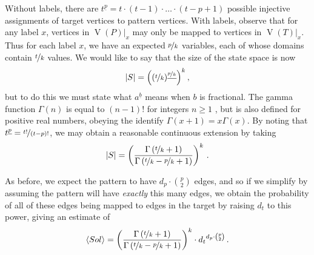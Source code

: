 \documentclass[twoside,11pt]{article}
\newcommand{\citep}[1]{\cite{#1}}
\begin{document}
Without labels, there are $t^{\underline{p}} = t \cdot (t - 1) \cdot \ldots \cdot (t - p + 1)$
possible injective assignments of target vertices to pattern vertices.  With labels, observe that
for any label $x$, vertices in $\operatorname{V}(P)|_x$ may only be mapped to vertices in
$\operatorname{V}(T)|_x$.  Thus for each label $x$, we have an expected $\nicefrac{p}{k}$ variables,
each of whose domains contain $\nicefrac{t}{k}$ values. We would like to say that the size of the
state space is now \[ |S| = \left((\nicefrac{t}{k})^{\underline{\nicefrac{p}{k}}}\right)^{k}
\textnormal{,} \] but to do this we must state what $a^{\underline{b}}$ means when $b$ is
fractional. The gamma function $\Gamma(n)$ is equal to $(n - 1)!$ for integers $n \ge 1$
\citep{Davis59}, but is also defined for positive real numbers, obeying the identify $\Gamma(x + 1)
= x\Gamma(x)$. By noting that $t^{\underline{p}} = \nicefrac{t!}{(t - p)!}$, we may obtain a
reasonable continuous extension by taking \[ |S| = \left(\frac{\Gamma\left(\nicefrac{t}{k} +
1\right)}{\Gamma\left(\nicefrac{t}{k} - \nicefrac{p}{k} + 1\right)}\right)^{k} \textnormal{\,.} \]

As before, we expect the pattern to have $d_p \cdot \binom{p}{2}$ edges, and so if we simplify by
assuming the pattern will have \emph{exactly} this many edges, we obtain the
probability of all of these edges being mapped to edges in the target by raising $d_t$ to this
power, giving an estimate of \begin{equation}\label{equation:non-induced-labelled-prediction} \langle Sol \rangle = \left(
    \frac{\Gamma\left(\nicefrac{t}{k} + 1\right)}{\Gamma\left(\nicefrac{t}{k} - \nicefrac{p}{k} +
1\right)} \right)^{k}  \cdot
{d_t}^{d_p \cdot \binom{p}{2}} \textnormal{\,.} \end{equation}
\end{document}
